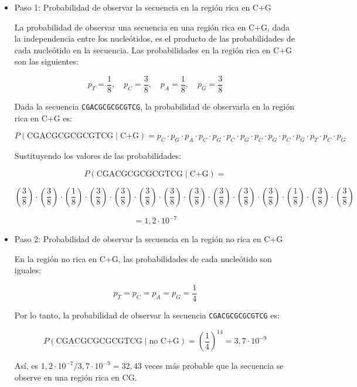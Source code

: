 \begin{itemize}
\item Paso 1: Probabilidad de observar la secuencia en la región rica en C+G

La probabilidad de observar una secuencia en una región rica en C+G, dada la independencia entre los nucleótidos, es el producto de las probabilidades de cada nucleótido en la secuencia. Las probabilidades en la región rica en C+G son las siguientes:

\[
p_T = \frac{1}{8}, \quad p_C = \frac{3}{8}, \quad p_A = \frac{1}{8}, \quad p_G = \frac{3}{8}
\]

Dada la secuencia \texttt{CGACGCGCGCGTCG}, la probabilidad de observarla en la región rica en C+G es:

\[
P(\text{CGACGCGCGCGTCG} \mid \text{C+G}) = p_C \cdot p_G \cdot p_A \cdot p_C \cdot p_G \cdot p_C \cdot p_G \cdot p_C \cdot p_G \cdot p_C \cdot p_G \cdot p_T \cdot p_C \cdot p_G
\]

Sustituyendo los valores de las probabilidades:

\small
\[
P(\text{CGACGCGCGCGTCG} \mid \text{C+G}) = 
\]

\[
\left( \frac{3}{8} \right) \cdot \left( \frac{3}{8} \right) \cdot \left( \frac{1}{8} \right) \cdot \left( \frac{3}{8} \right) \cdot \left( \frac{3}{8} \right) \cdot \left( \frac{3}{8} \right) \cdot \left( \frac{3}{8} \right) \cdot \left( \frac{3}{8} \right) \cdot \left( \frac{3}{8} \right) \cdot \left( \frac{3}{8} \right) \cdot \left( \frac{3}{8} \right) \cdot \left( \frac{1}{8} \right) \cdot \left( \frac{3}{8} \right) \cdot \left( \frac{3}{8} \right)
\]

\[
= 1,2 \cdot 10^{-7}
\]

\normalsize

\item Paso 2: Probabilidad de observar la secuencia en la región no rica en C+G

En la región no rica en C+G, las probabilidades de cada nucleótido son iguales:

\[
p_T = p_C = p_A = p_G = \frac{1}{4}
\]

Por lo tanto, la probabilidad de observar la secuencia \texttt{CGACGCGCGCGTCG} es:

\[
P(\text{CGACGCGCGCGTCG} \mid \text{no C+G}) = \left( \frac{1}{4} \right)^{14} = 3,7 \cdot 10^{-9}
\]

Así, es $1,2 \cdot 10^{-7} / 3,7 \cdot 10^{-9} = 32,43$ veces más probable que la secuencia se observe en una región rica en CG.


\end{itemize}
